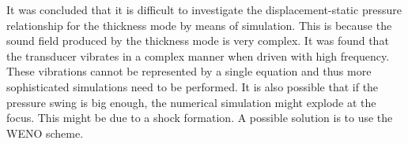 It was concluded that it is difficult to investigate the displacement-static pressure relationship for the thickness mode by means of simulation. This is because the sound field produced by the thickness mode is very complex. It was found that the transducer vibrates in a complex manner when driven with high frequency. These vibrations cannot be represented by a single equation and thus more sophisticated simulations need to be performed. It is also possible that if the pressure swing is big enough, the numerical simulation might explode at the focus. This might be due to a shock formation. A possible solution is to use the WENO scheme. \cite{Appert2003}